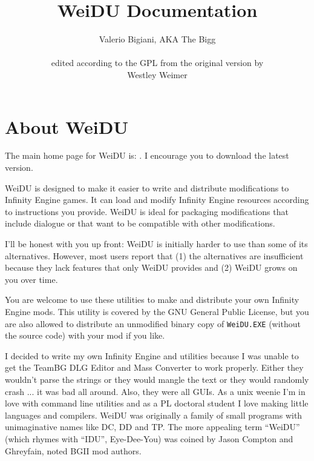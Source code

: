 \documentclass{article}
\title{WeiDU Documentation}
\author{Valerio Bigiani, AKA The Bigg\\
\mailto{thebigg@spellholdstudios.net}\\
edited according to the GPL from the original version by \\
Westley Weimer\\
 \mailto{weimer@cs.berkley.edu}}
\def\ttref#1{\ahrefloc{#1}{\tt #1}}
\def\DEFINE#1{{\tt \bf #1}\label{#1}\index{#1}}
\def\t#1{{\tt #1}}
\begin{document}
\maketitle
\tableofcontents



\section{About WeiDU}

The main home page for WeiDU is:
.
I encourage you to download the latest version. 

WeiDU is designed to make it easier to write and distribute modifications
to Infinity Engine games. It can load and modify Infinity Engine resources
according to instructions you provide. WeiDU is ideal for packaging
modifications that include dialogue or that want to be compatible with
other modifications. 

I'll be honest with you up front: WeiDU is initially harder to use than
some of its alternatives. However, most users report that (1) the
alternatives are insufficient because they lack features that only WeiDU
provides and (2) WeiDU grows on you over time. 

You are welcome to use these utilities to make and distribute your own
Infinity Engine mods. This utility is covered by the GNU General Public
License, but you are also allowed to distribute an unmodified binary copy
of \t{WeiDU.EXE} (without the source code) with your mod if you like.

I decided to write my own Infinity Engine \ttref{DLG} and \ttref{TLK}
utilities because I was unable to get the TeamBG DLG Editor and Mass
Converter to work properly. Either they wouldn't parse the strings or they
would mangle the text or they would randomly crash ... it was bad all
around. Also, they were all GUIs. As a unix weenie I'm in love with command
line utilities and as a PL doctoral student I love making little languages
and compilers.  WeiDU was originally a family of small programs with
unimaginative names like DC, DD and TP. The more appealing term ``WeiDU''
(which rhymes with ``IDU'', Eye-Dee-You) was coined by Jason Compton and
Ghreyfain, noted BGII mod authors. 
\end{document}
